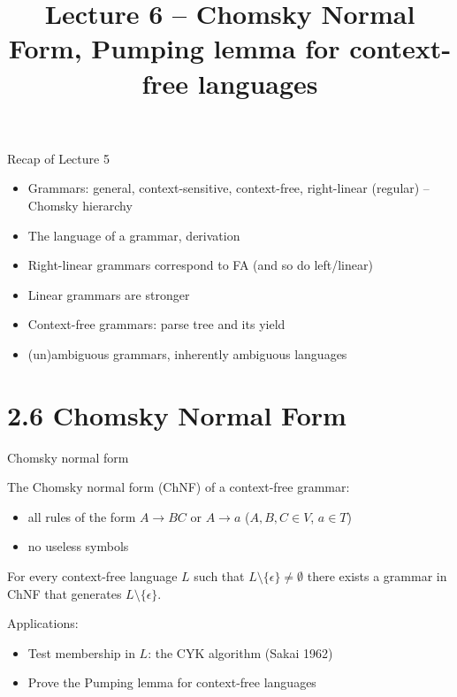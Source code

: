 \documentclass[handout]{beamer}
\title{Lecture 6 -- Chomsky Normal Form, Pumping lemma for context-free languages}
\begin{document}
\frame{\titlepage}


\begin{frame}{Recap of Lecture 5}
	
	\begin{itemize}
		\item Grammars: general, context-sensitive, context-free, right-linear (regular) -- Chomsky hierarchy
		\item The language of a grammar, derivation
		\item Right-linear grammars correspond to FA (and so do left/linear)
		\item Linear grammars are stronger
		\item Context-free grammars: parse tree and its yield
		\item (un)ambiguous grammars, inherently ambiguous languages
	\end{itemize}

\end{frame}


\section{2.6 Chomsky Normal Form}


\begin{frame}{Chomsky normal form}
	
	The \alert{Chomsky normal form (ChNF)} of a context-free grammar:
	
	\begin{itemize}
		\item all rules of the form \alert{$A\to BC$} or  \alert{$A\to a$} ($A,B,C\in V$, $a\in T$)
		\item no \alert{useless} symbols
	\end{itemize}

	\begin{theorem}
		For every context-free language $L$ such that $L\setminus \{\epsilon\}\neq \emptyset$ there exists a grammar in ChNF that generates $L\setminus \{\epsilon\}$.
	\end{theorem}
	
	Applications:
	
	\begin{itemize}
		\item Test membership in $L$: the \alert{CYK algorithm} (Sakai 1962) 
		\item Prove the \alert{Pumping lemma for context-free languages}
	\end{itemize}

\end{frame}
\end{document}
